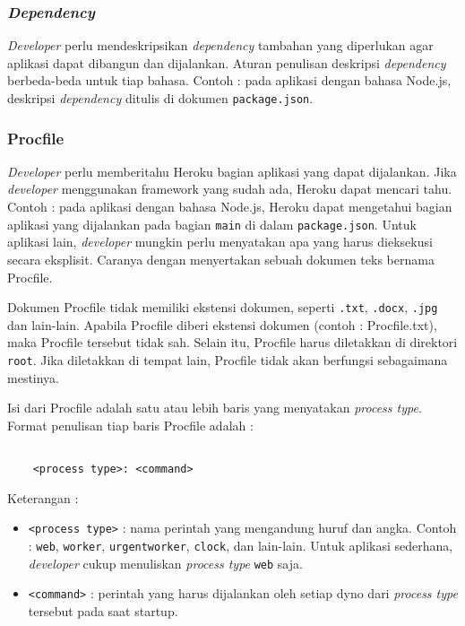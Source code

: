 \subsubsection{\textit{Dependency}}
\textit{Developer} perlu mendeskripsikan \textit{dependency} tambahan yang diperlukan agar aplikasi dapat dibangun dan dijalankan. Aturan penulisan deskripsi \textit{dependency} berbeda-beda untuk tiap bahasa. Contoh : pada aplikasi dengan bahasa Node.js, deskripsi \textit{dependency} ditulis di dokumen \texttt{package.json}.

\subsubsection{Procfile}
\textit{Developer} perlu memberitahu Heroku bagian aplikasi yang dapat dijalankan. Jika \textit{developer} menggunakan framework yang sudah ada, Heroku dapat mencari tahu. Contoh : pada aplikasi dengan bahasa Node.js, Heroku dapat mengetahui bagian aplikasi yang dijalankan pada bagian \texttt{main} di dalam \texttt{package.json}. Untuk aplikasi lain, \textit{developer} mungkin perlu menyatakan apa yang harus dieksekusi secara eksplisit. Caranya dengan menyertakan sebuah dokumen teks bernama Procfile. 

Dokumen Procfile tidak memiliki ekstensi dokumen, seperti \texttt{.txt}, \texttt{.docx}, \texttt{.jpg} dan lain-lain. Apabila Procfile diberi ekstensi dokumen (contoh : Procfile.txt), maka Procfile tersebut tidak sah. Selain itu, Procfile harus diletakkan di direktori \texttt{root}. Jika diletakkan di tempat lain, Procfile tidak akan berfungsi sebagaimana mestinya.

Isi dari Procfile adalah satu atau lebih baris yang menyatakan \textit{process type}. Format penulisan tiap baris Procfile adalah : 
\begin{lstlisting}

	<process type>: <command>

\end{lstlisting}
Keterangan :
\begin{itemize}
\item \texttt{<process type>} : nama perintah yang mengandung huruf dan angka. Contoh : \texttt{web}, \texttt{worker}, \texttt{urgentworker}, \texttt{clock}, dan lain-lain. Untuk aplikasi sederhana, \textit{developer} cukup menuliskan \textit{process type} \texttt{web} saja.
\item \texttt{<command>} : perintah yang harus dijalankan oleh setiap dyno dari \textit{process type} tersebut pada saat startup.
\end{itemize}
 
